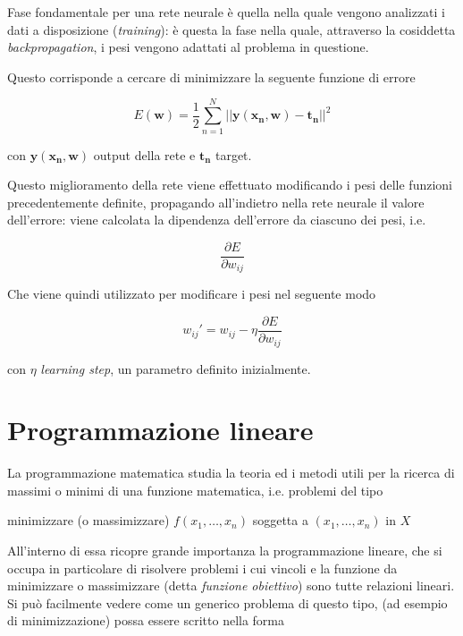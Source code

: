 Fase fondamentale per una rete neurale è quella nella quale vengono analizzati i dati a disposizione 
(\textit{training}): è questa la fase nella quale, attraverso la cosiddetta \textit{backpropagation}, 
i pesi vengono adattati al problema in questione.

Questo corrisponde a cercare di minimizzare la seguente funzione di errore \cite{bishop2006pattern}

\begin{equation}
    E(\mathbf{w}) = \frac{1}{2} \sum_{n=1}^{N} || \mathbf{y(x_n, w) - t_n} || ^2
    \label{eq:error_nn}
\end{equation}

con $\mathbf{y(x_n, w)}$ output della rete e $\mathbf{t_n}$ target.

Questo miglioramento della rete viene effettuato modificando i pesi delle funzioni 
precedentemente definite, propagando all'indietro nella rete neurale il valore dell'errore:
viene calcolata la dipendenza dell'errore da ciascuno dei pesi, i.e.

\begin{equation}
    \frac{\partial E}{\partial w_{ij}} 
    \label{eq:err_nn}
\end{equation}

Che viene quindi utilizzato per modificare i pesi nel seguente modo \cite{Mazur2015}

\begin{equation}
    w_{ij}' = w_{ij} - \eta  \frac{\partial E}{\partial w_{ij}}
    \label{eq:back_err}
\end{equation}

\noindent
con $\eta$ \textit{learning step}, un parametro definito inizialmente.

\newpage

\section{Programmazione lineare}
\label{section:lin_programming}

La programmazione matematica studia la teoria ed i metodi utili per la ricerca 
di massimi o minimi di una funzione matematica, i.e. problemi del tipo 
\cite{walsh1985introduction}

\begin{center}
    minimizzare (o massimizzare) $f(x_1, \dots, x_n)$ soggetta a $(x_1, \dots, x_n)$ in $X$    
\end{center}

All'interno di essa ricopre 
grande importanza la programmazione lineare, che si occupa in particolare di risolvere 
problemi i cui vincoli e la funzione da minimizzare o massimizzare (detta 
\textit{funzione obiettivo}) sono tutte relazioni lineari\cite{walsh1985introduction}.
Si può facilmente vedere come un generico problema di questo tipo, (ad esempio di minimizzazione) 
possa essere scritto nella forma\cite{1990}

